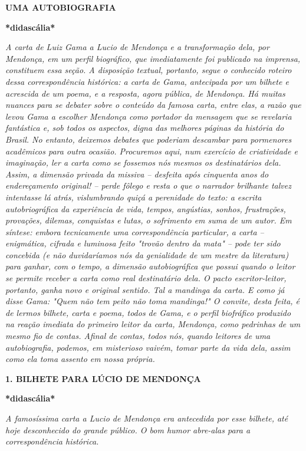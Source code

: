 \textbf{UMA AUTOBIOGRAFIA}

\textbf{*didascália*}

\emph{A carta de Luiz Gama a Lucio de Mendonça e a transformação dela,
por Mendonça, em um perfil biográfico, que imediatamente foi publicado
na imprensa, constituem essa seção. A disposição textual, portanto,
segue o conhecido roteiro dessa correspondência histórica: a carta de
Gama, antecipada por um bilhete e acrescida de um poema, e a resposta,
agora pública, de Mendonça. Há muitas nuances para se debater sobre o
conteúdo da famosa carta, entre elas, a razão que levou Gama a escolher
Mendonça como portador da mensagem que se revelaria fantástica e, sob
todos os aspectos, digna das melhores páginas da história do Brasil. No
entanto, deixemos debates que poderiam descambar para pormenores
acadêmicos para outra ocasião. Procuremos aqui, num exercício de
criatividade e imaginação, ler a carta como se fossemos nós mesmos os
destinatários dela. Assim, a dimensão privada da missiva -- desfeita
após cinquenta anos do endereçamento original! -- perde fôlego e resta o
que o narrador brilhante talvez intentasse lá atrás, vislumbrando quiçá
a perenidade do texto: a escrita autobriográfica da experiência de vida,
tempos, angústias, sonhos, frustrações, provações, dilemas, conquistas e
lutas, o sofrimento em suma de um autor. Em síntese: embora tecnicamente
uma correspondência particular, a carta -- enigmática, cifrada e
luminosa feito "trovão dentro da mata" -- pode ter sido concebida (e não
duvidaríamos nós da genialidade de um mestre da literatura) para ganhar,
com o tempo, a dimensão autobiográfica que possui quando o leitor se
permite receber a carta como real destinatário dela. O pacto
escritor-leitor, portanto, ganha novo e original sentido. Tal a mandinga
da carta. E como já disse Gama: "Quem não tem peito não toma mandinga!"
O convite, desta feita, é de lermos bilhete, carta e poema, todos de
Gama, e o perfil biofráfico produzido na reação imediata do primeiro
leitor da carta, Mendonça, como pedrinhas de um mesmo fio de contas.
Afinal de contas, todos nós, quando leitores de uma autobiografia,
podemos, em misterioso vaivém, tomar parte da vida dela, assim como ela
toma assento em nossa própria.}

\textbf{1. BILHETE PARA LÚCIO DE MENDONÇA}

\textbf{*didascália*}

\emph{A famosíssima carta a Lucio de Mendonça era antecedida por esse
bilhete, até hoje desconhecido do grande público. O bom humor abre-alas
para a correspondência histórica. }

